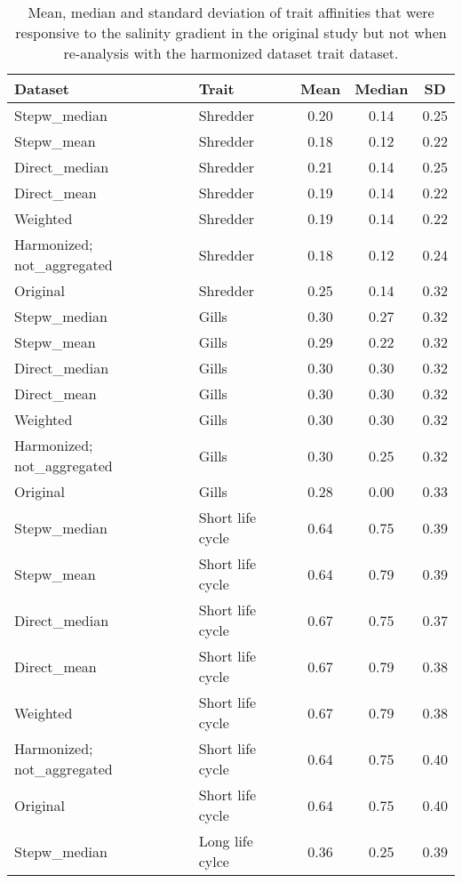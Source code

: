 \documentclass[../Draft_harmonization_paper.tex]{subfiles}
\begin{document}
\begin{table}[ht]
    \centering
    \caption{Mean, median and standard deviation of trait affinities that were responsive to the salinity gradient in the original study but not when re-analysis with the harmonized dataset trait dataset.} 
    \label{tab:SI_resp_traits_summary_stats}
    \begin{tabular}{llccc}
    \toprule[.1em]
    Dataset & Trait & Mean & Median & SD \\ 
    \toprule[.1em]
    Stepw\_median & Shredder & 0.20 & 0.14 & 0.25 \\ 
      Stepw\_mean & Shredder & 0.18 & 0.12 & 0.22 \\ 
      Direct\_median & Shredder & 0.21 & 0.14 & 0.25 \\ 
      Direct\_mean & Shredder & 0.19 & 0.14 & 0.22 \\ 
      Weighted & Shredder & 0.19 & 0.14 & 0.22 \\ 
      Harmonized; not\_aggregated & Shredder & 0.18 & 0.12 & 0.24 \\ 
      Original & Shredder & 0.25 & 0.14 & 0.32 \\ 
      Stepw\_median & Gills & 0.30 & 0.27 & 0.32 \\ 
      Stepw\_mean & Gills & 0.29 & 0.22 & 0.32 \\ 
      Direct\_median & Gills & 0.30 & 0.30 & 0.32 \\ 
      Direct\_mean & Gills & 0.30 & 0.30 & 0.32 \\ 
      Weighted & Gills & 0.30 & 0.30 & 0.32 \\ 
      Harmonized; not\_aggregated & Gills & 0.30 & 0.25 & 0.32 \\ 
      Original & Gills & 0.28 & 0.00 & 0.33 \\ 
      Stepw\_median & Short life cycle & 0.64 & 0.75 & 0.39 \\ 
      Stepw\_mean & Short life cycle & 0.64 & 0.79 & 0.39 \\ 
      Direct\_median & Short life cycle & 0.67 & 0.75 & 0.37 \\ 
      Direct\_mean & Short life cycle & 0.67 & 0.79 & 0.38 \\ 
      Weighted & Short life cycle & 0.67 & 0.79 & 0.38 \\ 
      Harmonized; not\_aggregated & Short life cycle & 0.64 & 0.75 & 0.40 \\ 
      Original & Short life cycle & 0.64 & 0.75 & 0.40 \\ 
      Stepw\_median & Long life cylce & 0.36 & 0.25 & 0.39 \\ 

\end{tabular}
\end{table}
\end{document}
